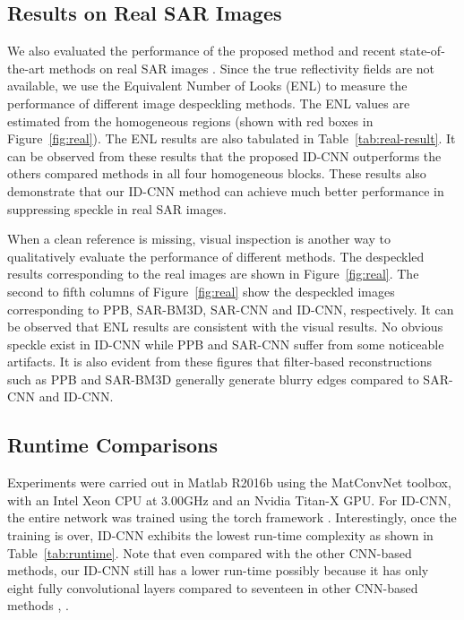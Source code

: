 \documentclass[journal]{IEEEtran}
\begin{document}
\subsection{Results on Real SAR Images}
We also evaluated the performance of the proposed method and recent state-of-the-art methods on real SAR  images \cite{Book_Cumming}.   Since the true reflectivity fields are not available, we use the Equivalent Number of Looks (ENL) \cite{ENL} to measure the performance of different image despeckling methods.  The ENL values are estimated from the homogeneous regions (shown with red boxes in Figure~\ref{fig:real}).  The ENL results are also tabulated in Table~\ref{tab:real-result}. It can be observed from these results that the proposed  ID-CNN outperforms the others compared methods in all four homogeneous blocks. These results also demonstrate that our ID-CNN method can achieve much better performance in suppressing  speckle in real SAR images. 




When a clean reference is missing, visual inspection is another way to qualitatively evaluate the performance of different methods. The despeckled results corresponding to the real images are shown in Figure~\ref{fig:real}.  The second to fifth columns of Figure~\ref{fig:real} show the despeckled images corresponding to PPB, SAR-BM3D, SAR-CNN and ID-CNN,  respectively. It can be observed that ENL results are consistent with the visual results. No obvious speckle exist in ID-CNN while PPB and SAR-CNN suffer from some noticeable
artifacts. It is also evident from these figures that filter-based reconstructions such as PPB and SAR-BM3D generally generate blurry edges compared to SAR-CNN and ID-CNN. 


\subsection{Runtime Comparisons}
Experiments were carried out in Matlab R2016b using the MatConvNet toolbox, with an Intel Xeon CPU at 3.00GHz and an Nvidia Titan-X GPU. For ID-CNN, the entire network was trained using the torch framework \cite{torch}. Interestingly, once the training is over, ID-CNN exhibits the lowest run-time complexity as shown in Table~\ref{tab:runtime}. Note that even compared with the other CNN-based methods, our ID-CNN still has a lower run-time possibly because it has only eight fully convolutional layers compared to seventeen in other CNN-based methods \cite{cnn}, \cite{sarcnn}. 
\end{document}
